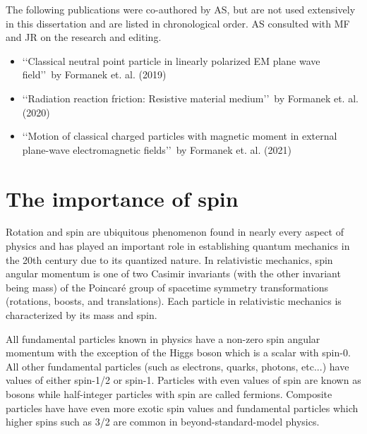 The following publications were co-authored by AS, but are not used extensively in this dissertation and are listed in chronological order. AS consulted with MF and JR on the research and editing.

\begin{itemize}
    \item \lq\lq Classical neutral point particle in linearly polarized EM plane wave field\rq\rq\ by Formanek et. al. (2019)
    \item \lq\lq Radiation reaction friction: Resistive material medium\rq\rq\ by Formanek et. al. (2020)
    \item \lq\lq Motion of classical charged particles with magnetic moment in external plane-wave electromagnetic fields\rq\rq\ by Formanek et. al. (2021)
\end{itemize}


\section{The importance of spin}
\label{sec:spin}
Rotation and spin are ubiquitous phenomenon found in nearly every aspect of physics and has played an important role in establishing quantum mechanics in the 20th century due to its quantized nature. In relativistic mechanics, spin angular momentum is one of two Casimir invariants (with the other invariant being mass) of the Poincar{\'e} group of spacetime symmetry transformations (rotations, boosts, and translations). Each particle in relativistic mechanics is characterized by its mass and spin.

All fundamental particles known in physics have a non-zero spin angular momentum with the exception of the Higgs boson which is a scalar with spin-0. All other fundamental particles (such as electrons, quarks, photons, etc...) have values of either spin-1/2 or spin-1. Particles with even values of spin are known as bosons while half-integer particles with spin are called fermions. Composite particles have have even more exotic spin values and fundamental particles which higher spins such as 3/2 are common in beyond-standard-model physics.

